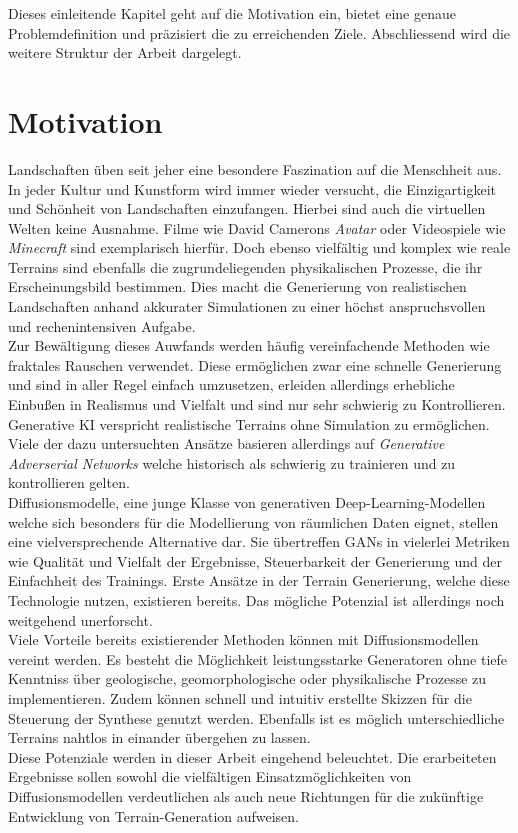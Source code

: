 Dieses einleitende Kapitel geht auf die Motivation ein, bietet eine genaue Problemdefinition und präzisiert die zu erreichenden Ziele. Abschliessend wird die weitere Struktur der Arbeit dargelegt. 


\section{Motivation}

Landschaften üben seit jeher eine besondere Faszination auf die Menschheit aus. In jeder Kultur und Kunstform wird immer wieder versucht, die Einzigartigkeit und Schönheit von Landschaften einzufangen. Hierbei sind auch die virtuellen Welten keine Ausnahme. Filme wie David Camerons \textit{Avatar} oder Videospiele wie \textit{Minecraft} sind exemplarisch hierfür. Doch ebenso vielfältig und komplex wie reale Terrains sind ebenfalls die zugrundeliegenden physikalischen Prozesse, die ihr Erscheinungsbild bestimmen. Dies macht die Generierung von realistischen Landschaften anhand akkurater Simulationen zu einer höchst anspruchsvollen und rechenintensiven Aufgabe. \\
Zur Bewältigung dieses Auwfands werden häufig vereinfachende Methoden wie fraktales Rauschen verwendet. Diese ermöglichen zwar eine schnelle Generierung und sind in aller Regel einfach umzusetzen, erleiden allerdings erhebliche Einbußen in Realismus und Vielfalt und sind nur sehr schwierig zu Kontrollieren. \\
Generative \ac{KI} verspricht realistische Terrains ohne Simulation zu ermöglichen. Viele der dazu untersuchten Ansätze basieren allerdings auf \textit{Generative Adverserial Networks} welche historisch als schwierig zu trainieren und zu kontrollieren gelten. \\
Diffusionsmodelle, eine junge Klasse von generativen Deep-Learning-Modellen welche sich besonders für die Modellierung von räumlichen Daten eignet, stellen eine vielversprechende Alternative dar. Sie übertreffen GANs in vielerlei Metriken wie Qualität und Vielfalt der Ergebnisse, Steuerbarkeit der Generierung und der Einfachheit des Trainings. Erste Ansätze in der Terrain Generierung, welche diese Technologie nutzen, existieren bereits. Das mögliche Potenzial ist allerdings noch weitgehend unerforscht. \\
Viele Vorteile bereits existierender Methoden können mit Diffusionsmodellen vereint werden. Es besteht die Möglichkeit leistungsstarke Generatoren ohne tiefe Kenntniss über geologische, geomorphologische oder physikalische Prozesse zu implementieren. Zudem können schnell und intuitiv erstellte Skizzen für die Steuerung der Synthese genutzt werden. Ebenfalls ist es möglich unterschiedliche Terrains nahtlos in einander übergehen zu lassen. \\
Diese Potenziale werden in dieser Arbeit eingehend beleuchtet. Die erarbeiteten Ergebnisse sollen sowohl die vielfältigen Einsatzmöglichkeiten von Diffusionsmodellen verdeutlichen als auch neue Richtungen für die zukünftige Entwicklung von Terrain-Generation aufweisen.


